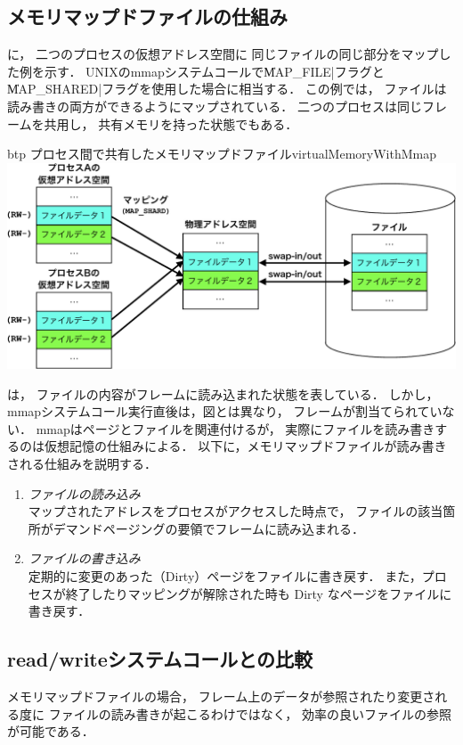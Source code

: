 \subsection{メモリマップドファイルの仕組み}
に，
二つのプロセスの仮想アドレス空間に
同じファイルの同じ部分をマップした例を示す．
UNIXのmmapシステムコールで\|MAP_FILE|フラグと
\|MAP_SHARED|フラグを使用した場合に相当する．
この例では，
ファイルは読み書きの両方ができるようにマップされている．
二つのプロセスは同じフレームを共用し，
共有メモリを持った状態でもある．

\begin{myfig}{btp}
  {プロセス間で共有したメモリマップドファイル}{virtualMemoryWithMmap}
  \includegraphics[scale=0.66]{Fig/virtualMemoryWithMmap-crop.pdf}
\end{myfig}

は，
ファイルの内容がフレームに読み込まれた状態を表している．
しかし，mmapシステムコール実行直後は，図とは異なり，
フレームが割当てられていない．
mmapはページとファイルを関連付けるが，
実際にファイルを読み書きするのは仮想記憶の仕組みによる．
以下に，メモリマップドファイルが読み書きされる仕組みを説明する．

\begin{enumerate}
\item \emph{ファイルの読み込み} \\
  マップされたアドレスをプロセスがアクセスした時点で，
  ファイルの該当箇所がデマンドページングの要領でフレームに読み込まれる．
\item \emph{ファイルの書き込み} \\
  定期的に変更のあった（Dirty）ページをファイルに書き戻す．
  また，プロセスが終了したりマッピングが解除された時も
  Dirty なページをファイルに書き戻す．
\end{enumerate}

\subsection{read/writeシステムコールとの比較}
メモリマップドファイルの場合，
フレーム上のデータが参照されたり変更される度に
ファイルの読み書きが起こるわけではなく，
効率の良いファイルの参照が可能である．


